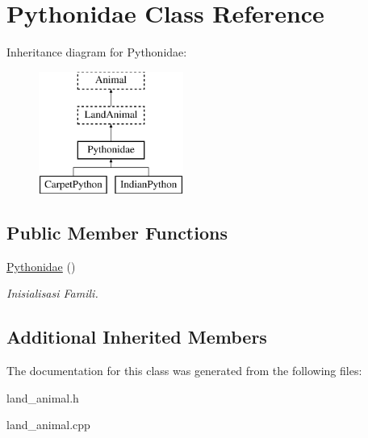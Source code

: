 \hypertarget{class_pythonidae}{}\section{Pythonidae Class Reference}
\label{class_pythonidae}
Inheritance diagram for Pythonidae\+:\begin{figure}[H]
\begin{center}
\leavevmode
\includegraphics[height=4.000000cm]{class_pythonidae}
\end{center}
\end{figure}
\subsection*{Public Member Functions}
\begin{DoxyCompactItemize}
\item 
\hyperlink{class_pythonidae_a58eeac322371dc72818f0db047f4d870}{Pythonidae} ()\hypertarget{class_pythonidae_a58eeac322371dc72818f0db047f4d870}{}\label{class_pythonidae_a58eeac322371dc72818f0db047f4d870}

\begin{DoxyCompactList}\small\item\em Inisialisasi Famili. \end{DoxyCompactList}\end{DoxyCompactItemize}
\subsection*{Additional Inherited Members}


The documentation for this class was generated from the following files\+:\begin{DoxyCompactItemize}
\item 
land\+\_\+animal.\+h\item 
land\+\_\+animal.\+cpp\end{DoxyCompactItemize}
